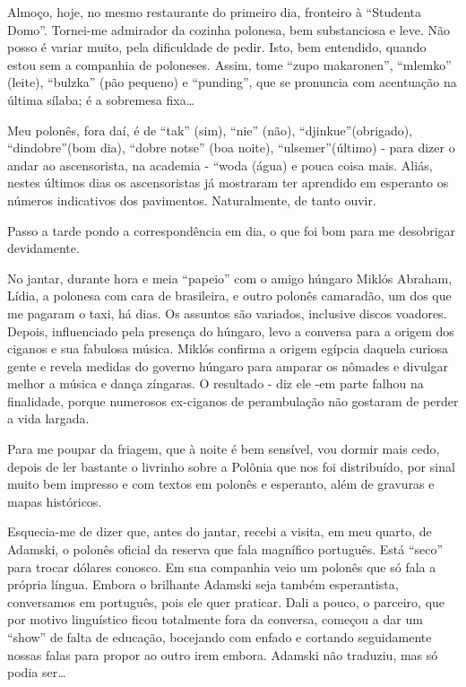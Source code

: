 Almoço, hoje, no mesmo restaurante do primeiro dia, fronteiro à “Studenta Domo”. Tornei-me admirador da cozinha polonesa, bem substanciosa e leve. Não posso é variar muito, pela dificuldade de pedir. Isto, bem entendido, quando estou sem a companhia de poloneses. Assim, tome “zupo makaronen”, “mlemko” (leite), “bulzka” (pão pequeno) e “punding”, que se pronuncia com acentuação na última sílaba; é a sobremesa fixa\ldots

Meu polonês, fora daí, é de “tak” (sim), “nie” (não), “djinkue”(obrigado), “dindobre”(bom dia), “dobre notse” (boa noite), “ulsemer”(último) - para dizer o andar ao ascensorista, na academia - “woda (água) e pouca coisa mais. Aliás, nestes últimos dias os ascensoristas já mostraram ter aprendido em esperanto os números indicativos dos pavimentos. Naturalmente, de tanto ouvir.

Passo a tarde pondo a correspondência em dia, o que foi bom para me desobrigar devidamente.

No jantar, durante hora e meia “papeio” com o amigo húngaro Miklós Abraham, Lídia, a polonesa com cara de brasileira, e outro polonês camaradão, um dos que me pagaram o taxi, há dias. Os assuntos são variados, inclusive discos voadores. Depois, influenciado pela presença do húngaro, levo a conversa para a origem dos ciganos e sua fabulosa música. Miklós confirma a origem egípcia daquela curiosa gente e revela medidas do governo húngaro para amparar os nômades e divulgar melhor a música e dança zíngaras. O resultado - diz ele -em parte falhou na finalidade, porque numerosos ex-ciganos de perambulação não gostaram de perder a vida largada.

Para me poupar da friagem, que à noite é bem sensível, vou dormir mais cedo, depois de ler bastante o livrinho sobre a Polônia que nos foi distribuído, por sinal muito bem impresso e com textos em polonês e esperanto, além de gravuras e mapas históricos.

Esquecia-me de dizer que, antes do jantar, recebi a visita, em meu quarto, de Adamski, o polonês oficial da reserva que fala magnífico português. Está “seco” para trocar dólares conosco. Em sua companhia veio um polonês que só fala a própria língua. Embora o brilhante Adamski seja também esperantista, conversamos em português, pois ele quer praticar. Dali a pouco, o parceiro, que por motivo linguístico ficou totalmente fora da conversa, começou a dar um “show” de falta de educação, bocejando com enfado e cortando seguidamente nossas falas para propor ao outro irem embora. Adamski não traduziu, mas só podia ser\ldots

